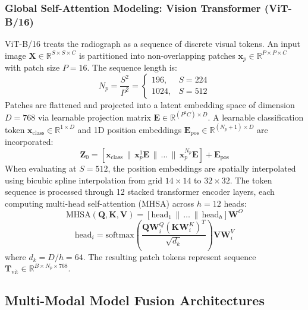\documentclass[journal]{IEEEtran}
\begin{document}
\subsubsection{Global Self-Attention Modeling: Vision Transformer (ViT-B/16)}
ViT-B/16 treats the radiograph as a sequence of discrete visual tokens. An input image $\mathbf{X} \in \mathbb{R}^{S \times S \times C}$ is partitioned into non-overlapping patches $\mathbf{x}_p \in \mathbb{R}^{P \times P \times C}$ with patch size $P=16$. The sequence length is:
\begin{equation}
N_p = \frac{S^2}{P^2} = \begin{cases}
196, & S = 224 \\
1024, & S = 512
\end{cases}
\end{equation}
Patches are flattened and projected into a latent embedding space of dimension $D = 768$ via learnable projection matrix $\mathbf{E} \in \mathbb{R}^{(P^2 C) \times D}$. A learnable classification token $\mathbf{x}_{\text{class}} \in \mathbb{R}^{1 \times D}$ and 1D position embeddings $\mathbf{E}_{\text{pos}} \in \mathbb{R}^{(N_p + 1) \times D}$ are incorporated:
\begin{equation}
\mathbf{Z}_0 = [\mathbf{x}_{\text{class}} \,\|\, \mathbf{x}_p^1\mathbf{E} \,\|\, \dots \,\|\, \mathbf{x}_p^{N_p}\mathbf{E}] + \mathbf{E}_{\text{pos}}
\end{equation}
When evaluating at $S=512$, the position embeddings are spatially interpolated using bicubic spline interpolation from grid $14 \times 14$ to $32 \times 32$. The token sequence is processed through 12 stacked transformer encoder layers, each computing multi-head self-attention (MHSA) across $h=12$ heads:
\begin{equation}
\text{MHSA}(\mathbf{Q}, \mathbf{K}, \mathbf{V}) = [\text{head}_1 \,\|\, \dots \,\|\, \text{head}_h]\mathbf{W}^O
\end{equation}
\begin{equation}
\text{head}_i = \text{softmax}\left(\frac{\mathbf{Q}\mathbf{W}_i^Q (\mathbf{K}\mathbf{W}_i^K)^T}{\sqrt{d_k}}\right) \mathbf{V}\mathbf{W}_i^V
\end{equation}
where $d_k = D / h = 64$. The resulting patch tokens represent sequence $\mathbf{T}_{\text{vit}} \in \mathbb{R}^{B \times N_p \times 768}$.

\subsection{Multi-Modal Model Fusion Architectures}
\label{subsec:fusion}
\end{document}
